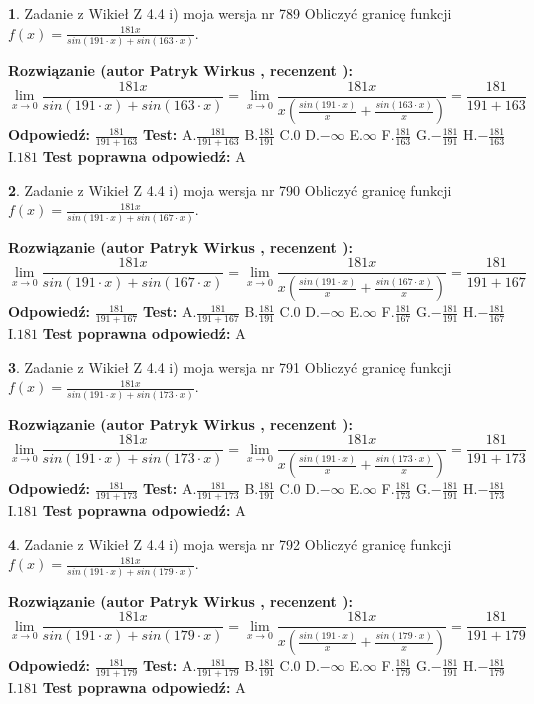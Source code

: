 \documentclass[12pt, a4paper]{article}
\theoremstyle{definition} %
\newtheorem{zad}{}
\newcommand{\zadStart}[1]{\begin{zad}#1\newline}
\newcommand{\zadStop}{\end{zad}}
\newcommand{\rozwStart}[2]{\noindent \textbf{Rozwiązanie (autor #1 , recenzent #2): }\newline}
\newcommand{\rozwStop}{\newline}
\newcommand{\odpStart}{\noindent \textbf{Odpowiedź:}\newline}
\newcommand{\odpStop}{\newline}
\newcommand{\testStart}{\noindent \textbf{Test:}\newline}
\newcommand{\testStop}{\newline}
\newcommand{\kluczStart}{\noindent \textbf{Test poprawna odpowiedź:}\newline}
\newcommand{\kluczStop}{\newline}
\begin{document}
\zadStart{Zadanie z Wikieł Z 4.4 i) moja wersja nr 789}
Obliczyć granicę funkcji $f(x)=\frac{181x}{sin(191\cdot x) +sin(163\cdot x)}$.
\zadStop
\rozwStart{Patryk Wirkus}{}
$$\lim\limits_{x\to 0}\frac{181x}{sin(191\cdot x) +sin(163\cdot x)}=\lim\limits_{x\to 0}\frac{181x}{x(\frac{sin(191\cdot x)}{x}+\frac{sin(163\cdot x)}{x})}=\frac{181}{191+163}$$
\rozwStop
\odpStart
$\frac{181}{191+163}$
\odpStop
\testStart
A.$\frac{181}{191+163}$
B.$\frac{181}{191}$
C.$0$
D.$-\infty$
E.$\infty$
F.$\frac{181}{163}$
G.$-\frac{181}{191}$
H.$-\frac{181}{163}$
I.$181$
\testStop
\kluczStart
A
\kluczStop



\zadStart{Zadanie z Wikieł Z 4.4 i) moja wersja nr 790}
Obliczyć granicę funkcji $f(x)=\frac{181x}{sin(191\cdot x) +sin(167\cdot x)}$.
\zadStop
\rozwStart{Patryk Wirkus}{}
$$\lim\limits_{x\to 0}\frac{181x}{sin(191\cdot x) +sin(167\cdot x)}=\lim\limits_{x\to 0}\frac{181x}{x(\frac{sin(191\cdot x)}{x}+\frac{sin(167\cdot x)}{x})}=\frac{181}{191+167}$$
\rozwStop
\odpStart
$\frac{181}{191+167}$
\odpStop
\testStart
A.$\frac{181}{191+167}$
B.$\frac{181}{191}$
C.$0$
D.$-\infty$
E.$\infty$
F.$\frac{181}{167}$
G.$-\frac{181}{191}$
H.$-\frac{181}{167}$
I.$181$
\testStop
\kluczStart
A
\kluczStop



\zadStart{Zadanie z Wikieł Z 4.4 i) moja wersja nr 791}
Obliczyć granicę funkcji $f(x)=\frac{181x}{sin(191\cdot x) +sin(173\cdot x)}$.
\zadStop
\rozwStart{Patryk Wirkus}{}
$$\lim\limits_{x\to 0}\frac{181x}{sin(191\cdot x) +sin(173\cdot x)}=\lim\limits_{x\to 0}\frac{181x}{x(\frac{sin(191\cdot x)}{x}+\frac{sin(173\cdot x)}{x})}=\frac{181}{191+173}$$
\rozwStop
\odpStart
$\frac{181}{191+173}$
\odpStop
\testStart
A.$\frac{181}{191+173}$
B.$\frac{181}{191}$
C.$0$
D.$-\infty$
E.$\infty$
F.$\frac{181}{173}$
G.$-\frac{181}{191}$
H.$-\frac{181}{173}$
I.$181$
\testStop
\kluczStart
A
\kluczStop



\zadStart{Zadanie z Wikieł Z 4.4 i) moja wersja nr 792}
Obliczyć granicę funkcji $f(x)=\frac{181x}{sin(191\cdot x) +sin(179\cdot x)}$.
\zadStop
\rozwStart{Patryk Wirkus}{}
$$\lim\limits_{x\to 0}\frac{181x}{sin(191\cdot x) +sin(179\cdot x)}=\lim\limits_{x\to 0}\frac{181x}{x(\frac{sin(191\cdot x)}{x}+\frac{sin(179\cdot x)}{x})}=\frac{181}{191+179}$$
\rozwStop
\odpStart
$\frac{181}{191+179}$
\odpStop
\testStart
A.$\frac{181}{191+179}$
B.$\frac{181}{191}$
C.$0$
D.$-\infty$
E.$\infty$
F.$\frac{181}{179}$
G.$-\frac{181}{191}$
H.$-\frac{181}{179}$
I.$181$
\testStop
\kluczStart
A
\kluczStop
\end{document}
